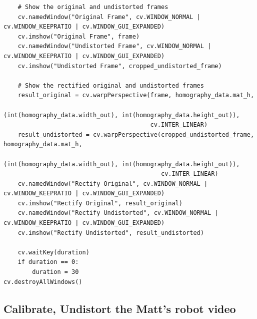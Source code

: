 \documentclass[a4paper, 12pt]{article}
\begin{document}
\begin{lstlisting}
    # Show the original and undistorted frames
    cv.namedWindow("Original Frame", cv.WINDOW_NORMAL | cv.WINDOW_KEEPRATIO | cv.WINDOW_GUI_EXPANDED)
    cv.imshow("Original Frame", frame)
    cv.namedWindow("Undistorted Frame", cv.WINDOW_NORMAL | cv.WINDOW_KEEPRATIO | cv.WINDOW_GUI_EXPANDED)
    cv.imshow("Undistorted Frame", cropped_undistorted_frame)

    # Show the rectified original and undistorted frames
    result_original = cv.warpPerspective(frame, homography_data.mat_h,
                                         (int(homography_data.width_out), int(homography_data.height_out)),
                                         cv.INTER_LINEAR)
    result_undistorted = cv.warpPerspective(cropped_undistorted_frame, homography_data.mat_h,
                                            (int(homography_data.width_out), int(homography_data.height_out)),
                                            cv.INTER_LINEAR)
    cv.namedWindow("Rectify Original", cv.WINDOW_NORMAL | cv.WINDOW_KEEPRATIO | cv.WINDOW_GUI_EXPANDED)
    cv.imshow("Rectify Original", result_original)
    cv.namedWindow("Rectify Undistorted", cv.WINDOW_NORMAL | cv.WINDOW_KEEPRATIO | cv.WINDOW_GUI_EXPANDED)
    cv.imshow("Rectify Undistorted", result_undistorted)

    cv.waitKey(duration)
    if duration == 0:
        duration = 30
cv.destroyAllWindows()
	\end{lstlisting}

	\subsection{Calibrate, Undistort the Matt's robot video}
\end{document}

